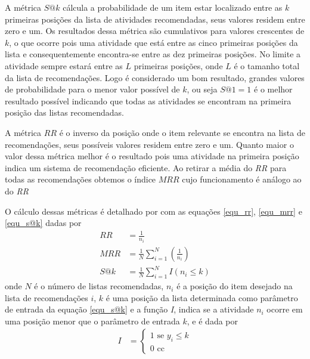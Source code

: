 A métrica \(S@k\) cálcula a probabilidade de um item estar localizado entre as \(k\) primeiras posições da lista de atividades recomendadas, seus valores residem entre zero e um. Os resultados dessa métrica são cumulativos para valores crescentes de \(k\), o que ocorre pois uma atividade que está entre as cinco primeiras posições da lista e consequentemente encontra-se entre as dez primeiras posições. No limite a atividade sempre estará entre as \(L\) primeiras posições, onde \(L\) é o tamanho total da lista de recomendações. Logo é considerado um bom resultado, grandes valores de probabilidade para o menor valor possível de \(k\), ou seja \(S@1 = 1\) é o melhor resultado possível indicando que todas as atividades se encontram na primeira posição das listas recomendadas.

A métrica \(RR\) é o inverso da posição onde o item relevante se encontra na lista de recomendações, seus possíveis valores residem entre zero e um. Quanto maior o valor dessa métrica melhor é o resultado pois uma atividade na primeira posição indica um sistema de recomendação eficiente. Ao retirar a média do \emph{RR} para todas as recomendações obtemos o índice \(MRR\) cujo funcionamento é análogo ao do \emph{RR}

O cálculo dessas métricas é detalhado por  com as equações \eqref{equ_rr}, \eqref{equ_mrr} e \eqref{equ_s@k} dadas por
\begin{align}
RR & = \frac{1}{n_{i}}													\label{equ_rr}\\
MRR &= \frac{1}{N} \sum\limits_{i=1}^{N} \left( \frac{1}{n_{i}} \right) \label{equ_mrr}\\
S@k &= \frac{1}{N} \sum\limits_{i=1}^{N} I(n_{i} \leq k) 				\label{equ_s@k}
\end{align}
onde \(N\) é o número de listas recomendadas, \(n_{i}\) é a posição do item desejado na lista de recomendações \(i\), \(k\) é uma posição da lista determinada como parâmetro de entrada da equação \eqref{equ_s@k} e a função \emph{I}, indica se a atividade \(n_{i}\) ocorre em uma posição menor que o parâmetro de entrada \(k\), e é dada por
\begin{align}
I   &= \begin{cases} \label{equ_indicativa}
			1 \textrm{ se } y_{i} \leq k \\
			0 \textrm{ cc }
	    \end{cases}
\end{align}

